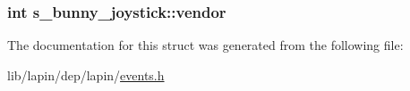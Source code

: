 \hypertarget{structs__bunny__joystick_a74d111731235abb1b62cf8b83d84c350}{
\subsubsection[{vendor}]{ {\bf int} s\-\_\-bunny\-\_\-joystick\-::vendor}}\label{structs__bunny__joystick_a74d111731235abb1b62cf8b83d84c350}


The documentation for this struct was generated from the following file\-:\begin{DoxyCompactItemize}
\item 
lib/lapin/dep/lapin/\hyperlink{events_8h}{events.\-h}\end{DoxyCompactItemize}
